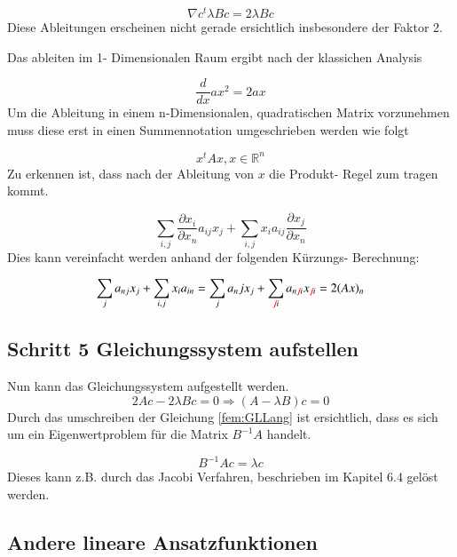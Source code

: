 \begin{equation}
	\nabla c^t \lambda Bc = 2\lambda Bc
\end{equation}
Diese Ableitungen erscheinen nicht gerade ersichtlich insbesondere der Faktor 2. 

Das ableiten im 1- Dimensionalen Raum ergibt nach der klassichen Analysis

\begin{equation}
	\frac{d}{dx} ax^2 = 2ax
\end{equation}
Um die Ableitung in einem n-Dimensionalen, quadratischen Matrix vorzunehmen muss diese erst in einen Summennotation umgeschrieben werden wie folgt

\begin{equation}
			x^tAx, x \in \mathbb{R}^n
\end{equation}
Zu erkennen ist, dass nach der Ableitung von $x$ die Produkt- Regel zum tragen kommt. 

\begin{equation}
	\sum_{i,j} \frac{\partial x_i}{\partial x_n} a_{ij} x_j + \sum_{i,j} x_i a_{ij} \frac{\partial x_j}{\partial x_n}
\end{equation}
Dies kann vereinfacht werden anhand der folgenden Kürzungs- Berechnung:

\begin{equation}
	\sum_{j} a_{nj} x_j + \sum_{i,j} x_i a_{in} = \sum_{j} a_nj x_j + \sum_{\textcolor{red}{\not{j}} i} a_{n \textcolor{red}{\not{j}} i} x_{\textcolor{red}{\not{j}} i} = 2(Ax)_n
\end{equation}

\subsection{Schritt 5 Gleichungssystem aufstellen}
Nun kann das Gleichungssystem aufgestellt werden.
\begin{equation}
	2Ac - 2\lambda Bc = 0 \Rightarrow (A-\lambda B)c = 0
	\label{fem:GLLang}
\end{equation}
Durch das umschreiben der Gleichung \ref{fem:GLLang} ist ersichtlich, dass es sich um ein Eigenwertproblem für die Matrix $B^{-1}A$ handelt.

\begin{equation}
		B^{-1}Ac = \lambda c
 \end{equation}
 Dieses kann z.B. durch das Jacobi Verfahren, beschrieben im Kapitel 6.4 gelöst werden.
 
\subsection{Andere lineare Ansatzfunktionen
\label{fem:subsection:Ansatzfunktionen}}

